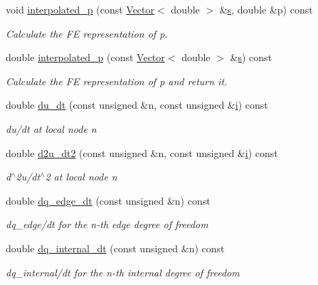 \begin{DoxyCompactItemize}
void \hyperlink{classoomph_1_1PoroelasticityEquations_a5e15413423cccf35153ac009667e0297}{interpolated\+\_\+p} (const \hyperlink{classoomph_1_1Vector}{Vector}$<$ double $>$ \&\hyperlink{cfortran_8h_ab7123126e4885ef647dd9c6e3807a21c}{s}, double \&p) const
\begin{DoxyCompactList}\small\item\em Calculate the FE representation of p. \end{DoxyCompactList}\item 
double \hyperlink{classoomph_1_1PoroelasticityEquations_ac26b9aaf9872c24d0d99ab651d59196f}{interpolated\+\_\+p} (const \hyperlink{classoomph_1_1Vector}{Vector}$<$ double $>$ \&\hyperlink{cfortran_8h_ab7123126e4885ef647dd9c6e3807a21c}{s}) const
\begin{DoxyCompactList}\small\item\em Calculate the FE representation of p and return it. \end{DoxyCompactList}\item 
double \hyperlink{classoomph_1_1PoroelasticityEquations_ad8e67101cbc50878375025722745675c}{du\+\_\+dt} (const unsigned \&n, const unsigned \&\hyperlink{cfortran_8h_adb50e893b86b3e55e751a42eab3cba82}{i}) const
\begin{DoxyCompactList}\small\item\em du/dt at local node n \end{DoxyCompactList}\item 
double \hyperlink{classoomph_1_1PoroelasticityEquations_a63bc087ce05092bd4f4a8defc35cb2ba}{d2u\+\_\+dt2} (const unsigned \&n, const unsigned \&\hyperlink{cfortran_8h_adb50e893b86b3e55e751a42eab3cba82}{i}) const
\begin{DoxyCompactList}\small\item\em d$^\wedge$2u/dt$^\wedge$2 at local node n \end{DoxyCompactList}\item 
double \hyperlink{classoomph_1_1PoroelasticityEquations_a571ce9f5c356d617eca9b2d875609c46}{dq\+\_\+edge\+\_\+dt} (const unsigned \&n) const
\begin{DoxyCompactList}\small\item\em dq\+\_\+edge/dt for the n-\/th edge degree of freedom \end{DoxyCompactList}\item 
double \hyperlink{classoomph_1_1PoroelasticityEquations_a0840e15b074162843932f724018e77c6}{dq\+\_\+internal\+\_\+dt} (const unsigned \&n) const
\begin{DoxyCompactList}\small\item\em dq\+\_\+internal/dt for the n-\/th internal degree of freedom \end{DoxyCompactList}\item 

\end{DoxyCompactItemize}
